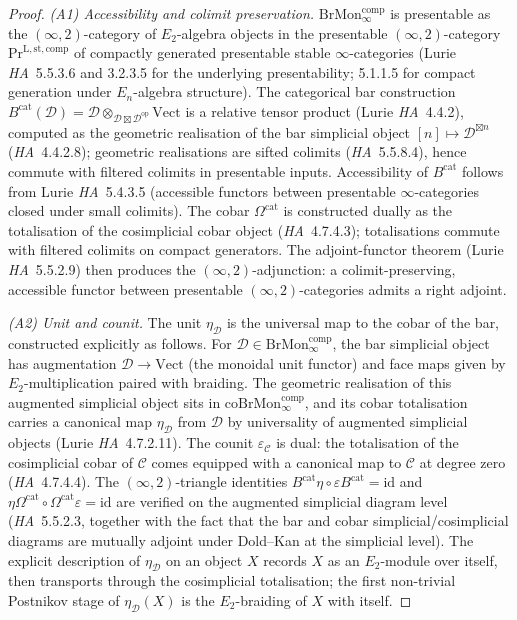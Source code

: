 \begin{proof}
\textit{(A1) Accessibility and colimit preservation.}\enspace
$\mathrm{BrMon}^{\mathrm{comp}}_\infty$ is presentable as the
$(\infty,2)$-category of $E_2$-algebra objects in the presentable
$(\infty,2)$-category $\mathrm{Pr}^{\mathrm{L,st,comp}}$ of compactly
generated presentable stable $\infty$-categories (Lurie
\emph{HA}~5.5.3.6 and 3.2.3.5 for the underlying presentability;
5.1.1.5 for compact generation under $E_n$-algebra structure). The
categorical bar construction
$B^{\mathrm{cat}}(\mathcal D) = \mathcal D \otimes_{\mathcal D \boxtimes
\mathcal D^{\mathrm{op}}} \mathrm{Vect}$ is a relative tensor product
(Lurie \emph{HA}~4.4.2), computed as the geometric realisation of the
bar simplicial object $[n] \mapsto \mathcal D^{\boxtimes n}$
(\emph{HA}~4.4.2.8); geometric realisations are sifted colimits
(\emph{HA}~5.5.8.4), hence commute with filtered colimits in
presentable inputs. Accessibility of $B^{\mathrm{cat}}$ follows from
Lurie \emph{HA}~5.4.3.5 (accessible functors between presentable
$\infty$-categories closed under small colimits). The cobar
$\Omega^{\mathrm{cat}}$ is constructed dually as the totalisation of
the cosimplicial cobar object (\emph{HA}~4.7.4.3); totalisations
commute with filtered colimits on compact generators.
The adjoint-functor theorem (Lurie \emph{HA}~5.5.2.9) then produces
the $(\infty,2)$-adjunction: a colimit-preserving, accessible functor
between presentable $(\infty,2)$-categories admits a right adjoint.

\textit{(A2) Unit and counit.}\enspace
The unit $\eta_{\mathcal D}$ is the universal map to the cobar of
the bar, constructed explicitly as follows. For
$\mathcal D \in \mathrm{BrMon}^{\mathrm{comp}}_\infty$, the bar
simplicial object has augmentation $\mathcal D \to \mathrm{Vect}$
(the monoidal unit functor) and face maps given by $E_2$-multiplication
paired with braiding. The geometric realisation of this augmented
simplicial object sits in $\mathrm{coBrMon}^{\mathrm{comp}}_\infty$,
and its cobar totalisation carries a canonical map $\eta_{\mathcal D}$
from $\mathcal D$ by universality of augmented simplicial objects
(Lurie \emph{HA}~4.7.2.11). The counit $\varepsilon_{\mathcal C}$
is dual: the totalisation of the cosimplicial cobar of $\mathcal C$
comes equipped with a canonical map to $\mathcal C$ at degree zero
(\emph{HA}~4.7.4.4). The $(\infty,2)$-triangle identities
$B^{\mathrm{cat}} \eta \circ \varepsilon B^{\mathrm{cat}} = \mathrm{id}$
and $\eta \Omega^{\mathrm{cat}} \circ \Omega^{\mathrm{cat}} \varepsilon = \mathrm{id}$
are verified on the augmented simplicial diagram level
(\emph{HA}~5.5.2.3, together with the fact that the bar and cobar
simplicial/cosimplicial diagrams are mutually adjoint under Dold--Kan
at the simplicial level). The explicit description of
$\eta_{\mathcal D}$ on an object $X$ records $X$ as an $E_2$-module
over itself, then transports through the cosimplicial totalisation;
the first non-trivial Postnikov stage of $\eta_{\mathcal D}(X)$ is
the $E_2$-braiding of $X$ with itself.


\end{proof}
